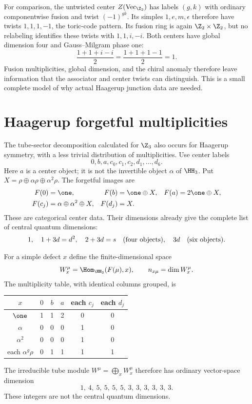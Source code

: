 \begin{example}
For comparison, the untwisted center
$Z(\operatorname{Vec}_{\Z_2})$ has labels $(g,k)$ with
ordinary componentwise fusion and twist $(-1)^{gk}$.
Its simples $1,e,m,\epsilon$ therefore have twists
$1,1,1,-1$, the toric-code pattern. Its fusion ring is again
$\Z_2\times\Z_2$, but no relabeling identifies these twists
with $1,1,i,-i$. Both centers have global dimension four and
Gauss--Milgram phase one:
\[
 \frac{1+1+i-i}{2}
 =\frac{1+1+1-1}{2}=1.
\]
Fusion multiplicities, global dimension, and the chiral anomaly
therefore leave information that the associator and center twists
can distinguish. This is a small complete model of why actual
Haagerup junction data are needed.
\end{example}

\section{Haagerup forgetful multiplicities}

The tube-sector decomposition calculated for $\Z_3$ also occurs
for Haagerup symmetry, with a less trivial distribution of
multiplicities. Use center labels
\[
 0,b,a,c_0,c_1,c_2,d_1,\ldots,d_6.
\]
Here $a$ is a center object; it is not the invertible object
$\alpha$ of $\HH_3$.  Put $X=\rho\oplus\alpha\rho\oplus
\alpha^2\rho$.  The forgetful images are
\begin{align}
 F(0)&=\one,&F(b)&=\one\oplus X,&F(a)&=2\one\oplus X,\notag\\
 F(c_j)&=\alpha\oplus\alpha^2\oplus X,&
 F(d_j)&=X.
 \label{eq:H3-forgetful}
\end{align}
These are categorical center data.  Their dimensions already give
the complete list of central quantum dimensions:
\[
 1,\quad1+3d=d^2,\quad2+3d=s\quad
 \hbox{(four objects)},\quad3d\quad\hbox{(six objects)}.
\]

For a simple defect $x$ define the finite-dimensional space
\begin{equation}
 W_x^\mu=\Hom_{\HH_3}(F(\mu),x),
 \qquad n_{x\mu}=\dim W_x^\mu.
 \label{eq:H3-W-definition}
\end{equation}
The multiplicity table, with identical columns grouped, is
\begin{center}
\begin{tabular}{c|ccccc}
$x$ & $0$ & $b$ & $a$ & each $c_j$ & each $d_j$\\\hline
$\one$ &1&1&2&0&0\\
$\alpha$ &0&0&0&1&0\\
$\alpha^2$ &0&0&0&1&0\\
each $\alpha^g\rho$ &0&1&1&1&1
\end{tabular}
\end{center}
The irreducible tube module $W^\mu=\bigoplus_xW_x^\mu$ therefore
has ordinary vector-space dimension
\begin{equation}
 1,\ 4,\ 5,\ 5,\ 5,\ 5,\ 3,\ 3,\ 3,\ 3,\ 3,\ 3.
 \label{eq:H3-tube-dimensions}
\end{equation}
These integers are not the central quantum dimensions.


